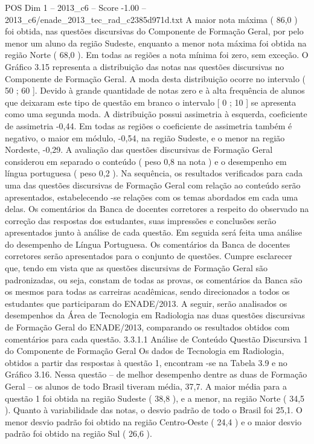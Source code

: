 \begin{textsample}{POS Dim 1 – 2013\_c6 – Score -1.00 – 2013\_c6/enade\_2013\_tec\_rad\_c2385d971d.txt}
A maior nota máxima ( 86,0 ) foi obtida, nas questões discursivas do Componente de Formação Geral, por pelo menor um aluno da região Sudeste, enquanto a menor nota máxima foi obtida na região Norte ( 68,0 ).
Em todas as regiões a nota mínima foi zero, sem exceção.
O Gráfico 3.15 representa a distribuição das notas nas questões discursivas no Componente de Formação Geral.
A moda desta distribuição ocorre no intervalo ( 50 ; 60 ].
Devido à grande quantidade de notas zero e à alta frequência de alunos que deixaram este tipo de questão em branco o intervalo [ 0 ; 10 ] se apresenta como uma segunda moda.
A distribuição possui assimetria à esquerda, coeficiente de assimetria -0,44.
Em todas as regiões o coeficiente de assimetria também é negativo, o maior em módulo, -0,54, na região Sudeste, e o menor na região Nordeste, -0,29.
A avaliação das questões discursivas de Formação Geral considerou em separado o conteúdo ( peso 0,8 na nota ) e o desempenho em língua portuguesa ( peso 0,2 ).
Na sequência, os resultados verificados para cada uma das questões discursivas de Formação Geral com relação ao conteúdo serão apresentados, estabelecendo -se relações com os temas abordados em cada uma delas.
Os comentários da Banca de docentes corretores a respeito do observado na correção das respostas dos estudantes, suas impressões e conclusões serão apresentados junto à análise de cada questão.
Em seguida será feita uma análise do desempenho de Língua Portuguesa.
Os comentários da Banca de docentes corretores serão apresentados para o conjunto de questões.
Cumpre esclarecer que, tendo em vista que as questões discursivas de Formação Geral são padronizadas, ou seja, constam de todas as provas, os comentários da Banca são os mesmos para todas as carreiras acadêmicas, sendo direcionados a todos os estudantes que participaram do ENADE/2013.
A seguir, serão analisados os desempenhos da Área de Tecnologia em Radiologia nas duas questões discursivas de Formação Geral do ENADE/2013, comparando os resultados obtidos com comentários para cada questão. 3.3.1.1 Análise de Conteúdo Questão Discursiva 1 do Componente de Formação Geral Os dados de Tecnologia em Radiologia, obtidos a partir das respostas à questão 1, encontram -se na Tabela 3.9 e no Gráfico 3.16.
Nessa questão – de melhor desempenho dentre as duas de Formação Geral – os alunos de todo Brasil tiveram média, 37,7.
A maior média para a questão 1 foi obtida na região Sudeste ( 38,8 ), e a menor, na região Norte ( 34,5 ).
Quanto à variabilidade das notas, o desvio padrão de todo o Brasil foi 25,1.
O menor desvio padrão foi obtido na região Centro-Oeste ( 24,4 ) e o maior desvio padrão foi obtido na região Sul ( 26,6 ).

\end{textsample}
